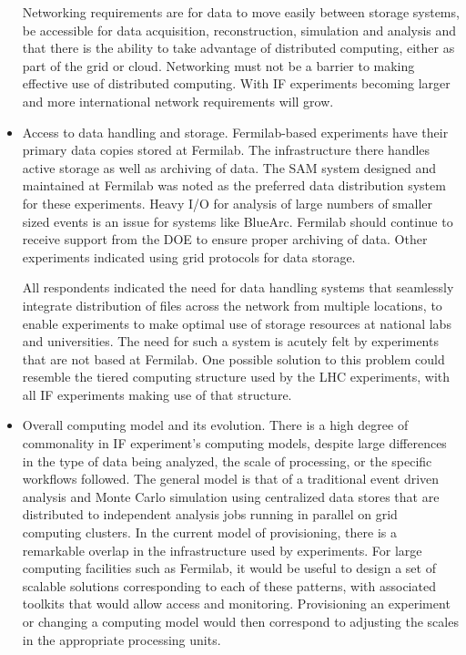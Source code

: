 \begin{itemize}
Networking requirements are for data to move easily between storage systems,
be accessible for data acquisition, reconstruction, simulation and analysis
and that there is the ability to take advantage of distributed computing,
either as part of the grid or cloud.  Networking must not be a barrier to
making effective use of distributed computing. With IF experiments becoming
larger and more international network requirements will grow.

\item Access to data handling and storage.   Fermilab-based experiments have
their primary data copies stored at Fermilab.  The infrastructure there
handles active storage as well as archiving of data.  The SAM system designed
and maintained at Fermilab was noted as the preferred data distribution system
for these experiments. Heavy I/O for analysis of large numbers of smaller
sized events is an issue for systems like BlueArc. Fermilab should continue to
receive support from the DOE to ensure proper archiving of data. Other
experiments indicated using grid protocols for data storage.

All respondents indicated the need for data handling systems that seamlessly
integrate distribution of files across the network from multiple locations, to
enable experiments to make optimal use of storage resources at national labs
and universities.  The need for such a system is acutely felt by experiments
that are not based at Fermilab.  One possible solution to this problem could
resemble the tiered computing structure used by the LHC experiments, with all
IF experiments making use of that structure.


\item Overall computing model and its evolution.  There is a high degree of
commonality in IF experiment's computing models, despite large differences in
the type of data being analyzed, the scale of processing, or the specific
workflows followed.   The general model is that of a traditional event driven
analysis and Monte Carlo simulation using centralized data stores that are
distributed to independent analysis jobs running in parallel on grid computing
clusters.  In the current model of provisioning, there is a remarkable overlap
in the infrastructure used by experiments. For large computing facilities such
as Fermilab, it would be useful to design a set of scalable solutions
corresponding to each of these patterns, with associated toolkits that would
allow access and monitoring. Provisioning an experiment or changing a
computing model would then correspond to adjusting the scales in the
appropriate processing units.


\end{itemize}
